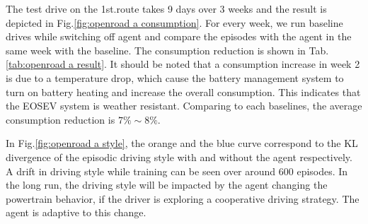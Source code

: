 \documentclass{article}
\begin{document}
The test drive on the 1st.\@ route takes 9 days over 3 weeks and the result is depicted in Fig.\@\ref{fig:openroad a consumption}. For every week, we run baseline drives while switching off agent and compare the episodes with the agent in the same week with the baseline. The consumption reduction is shown in Tab.\@\ref{tab:openroad a result}. It should be noted that a consumption increase in week 2 is due to a temperature drop, which cause the battery management system to turn on battery heating and increase the overall consumption. This indicates that the EOSEV system is weather resistant. Comparing to each baselines, the average consumption reduction is $7\%\sim8\%$.

In Fig.\@\ref{fig:openroad a style}, the orange and the blue curve correspond to the KL divergence of the episodic driving style with and without the agent respectively. A drift in driving style while training can be seen over around 600 episodes. In the long run, the driving style will be impacted by the agent changing the powertrain behavior, if the driver is exploring a cooperative driving strategy. The agent is adaptive to this change.
\end{document}

